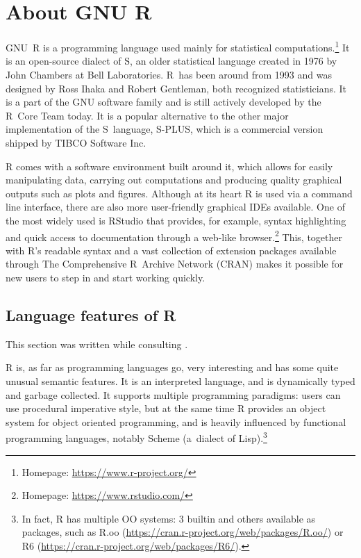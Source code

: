 \chapter{About GNU R\label{gnur}}

GNU~R \autocite{about} is a programming language used mainly for statistical computations.\footnote{Homepage: \url{https://www.r-project.org/}} It is an open-source dialect of S, an older statistical language created in 1976 by John Chambers at Bell Laboratories. R~has been around from 1993 and was designed by Ross Ihaka and Robert Gentleman, both recognized statisticians. It is a part of the GNU software family and is still actively developed by the R~Core Team today. It is a popular alternative to the other major implementation of the S~language, S-PLUS, which is a commercial version shipped by TIBCO Software Inc.

R comes with a software environment built around it, which allows for easily manipulating data, carrying out computations and producing quality graphical outputs such as plots and figures. Although at its heart R is used via a command line interface, there are also more user-friendly graphical IDEs available. One of the most widely used is RStudio that provides, for example, syntax highlighting and quick access to documentation through a web-like browser.\footnote{Homepage: \url{https://www.rstudio.com/}} This, together with R's readable syntax and a vast collection of extension packages available through The Comprehensive R~Archive Network (CRAN) makes it possible for new users to step in and start working quickly.


\section{Language features of R}

This section was written while consulting \autocite{hadley, design, inferno, rint, rlang}.

R is, as far as programming languages go, very interesting and has some quite unusual semantic features. It is an interpreted language, and is dynamically typed and garbage collected. It supports multiple programming paradigms: users can use procedural imperative style, but at the same time R provides an object system for object oriented programming, and is heavily influenced by functional programming languages, notably Scheme (a~dialect of Lisp).\footnote{In fact, R has multiple OO systems: 3 builtin and others available as packages, such as R.oo (\url{https://cran.r-project.org/web/packages/R.oo/}) or R6 (\url{https://cran.r-project.org/web/packages/R6/}).}

